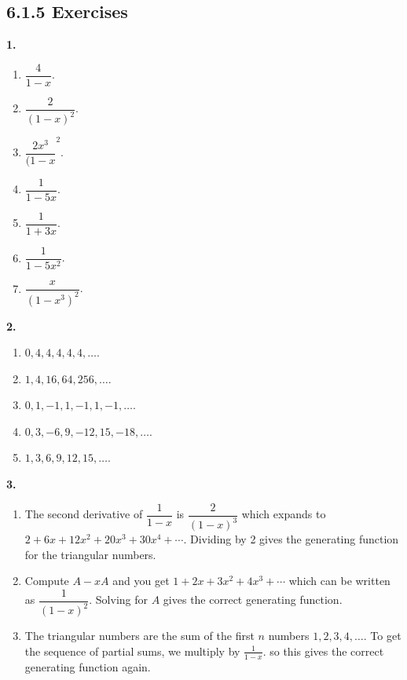 \documentclass[10pt,]{book}
\theoremstyle{plain}
\theoremstyle{definition}
\theoremstyle{definition}
\theoremstyle{definition}
\numberwithin{equation}{chapter}
\begin{document}
\subsection*{6.1.5 Exercises}
\noindent\textbf{1.}\quad{}\leavevmode%
\begin{enumerate}[label=(\alph*)]
\item\hypertarget{li-1325}{}\(\dfrac{4}{1-x}\).%
\item\hypertarget{li-1326}{}\(\dfrac{2}{(1-x)^2}\).%
\item\hypertarget{li-1327}{}\(\dfrac{2x^3}{(1-x}^2\).%
\item\hypertarget{li-1328}{}\(\dfrac{1}{1-5x}\).%
\item\hypertarget{li-1329}{}\(\dfrac{1}{1+3x}\).%
\item\hypertarget{li-1330}{}\(\dfrac{1}{1-5x^2}\).%
\item\hypertarget{li-1331}{}\(\dfrac{x}{(1-x^3)^2}\).%
\end{enumerate}
\par\smallskip
\noindent\textbf{2.}\quad{}\leavevmode%
\begin{enumerate}[label=(\alph*)]
\item\hypertarget{li-1337}{}\(0, 4, 4, 4, 4, 4, \ldots\).%
\item\hypertarget{li-1338}{}\(1, 4, 16, 64, 256, \ldots\).%
\item\hypertarget{li-1339}{}\(0, 1, -1, 1, -1, 1, -1, \ldots\).%
\item\hypertarget{li-1340}{}\(0, 3, -6, 9, -12, 15, -18, \ldots\).%
\item\hypertarget{li-1341}{}\(1, 3, 6, 9, 12, 15, \ldots\).%
\end{enumerate}
\par\smallskip
\noindent\textbf{3.}\quad{}\leavevmode%
\begin{enumerate}[label=(\alph*)]
\item\hypertarget{li-1345}{}
The second derivative of \(\dfrac{1}{1-x}\) is \(\dfrac{2}{(1-x)^3}\) which expands to \(2 + 6x + 12x^2 + 20x^3 + 30x^4 + \cdots\).  Dividing by 2 gives the generating function for the triangular numbers.
%
\item\hypertarget{li-1346}{}
Compute \(A - xA\) and you get \(1 + 2x + 3x^2 + 4x^3 + \cdots\) which can be written as \(\dfrac{1}{(1-x)^2}\).  Solving for \(A\) gives the correct generating function.
%
\item\hypertarget{li-1347}{}
The triangular numbers are the sum of the first \(n\) numbers \(1,2,3,4, \ldots\).  To get the sequence of partial sums, we multiply by \(\frac{1}{1-x}\). so this gives the correct generating function again.
%
\end{enumerate}
\end{document}
